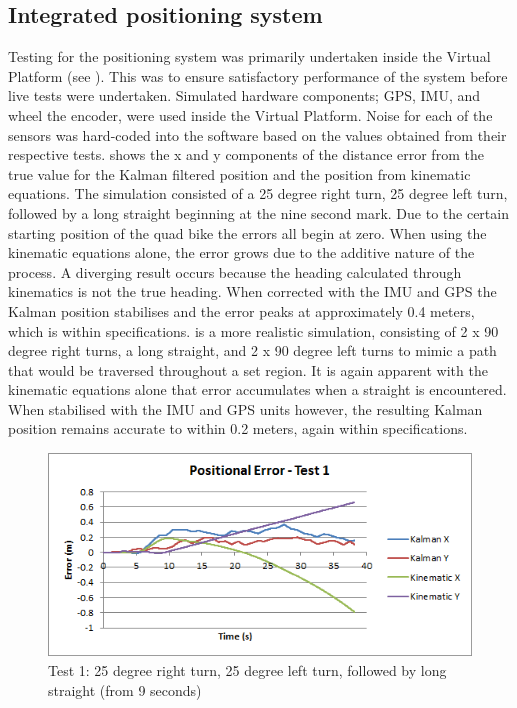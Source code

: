 \documentclass[main.tex]{subfiles}
\begin{document}
\subsection{Integrated positioning system}
Testing for the positioning system was primarily undertaken inside the Virtual Platform (see ). This was to ensure satisfactory performance of the system before live tests were undertaken. Simulated hardware components; GPS, IMU, and wheel the encoder, were used inside the Virtual Platform. Noise for each of the sensors was hard-coded into the software based on the values obtained from their respective tests.
 shows the x and y components of the distance error from the true value for the Kalman filtered position and the position from kinematic equations. The simulation consisted of a 25 degree right turn, 25 degree left turn, followed by a long straight beginning at the nine second mark. Due to the certain starting position of the quad bike the errors all begin at zero. When using the kinematic equations alone, the error grows due to the additive nature of the process. A diverging result occurs because the heading calculated through kinematics is not the true heading. When corrected with the IMU and GPS the Kalman position stabilises and the error peaks at approximately 0.4 meters, which is within specifications.  is a more realistic simulation, consisting of 2 x 90 degree right turns, a long straight, and 2 x 90 degree left turns to mimic a path that would be traversed throughout a set region. It is again apparent with the kinematic equations alone that error accumulates when a straight is encountered. When stabilised with the IMU and GPS units however, the resulting Kalman position remains accurate to within 0.2 meters, again within specifications.
\begin{figure}[ht]
\includegraphics[width=\textwidth]{5-Testing/position_error_test_1.png}
\centering
\caption[Positioning system test 1]{Test 1: 25 degree right turn, 25 degree left turn, followed by long straight (from 9 seconds)}
\end{figure}
\end{document}
